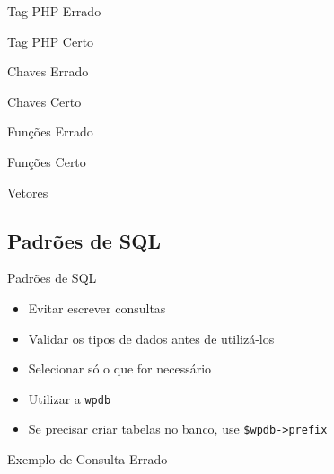 \documentclass{beamer}
\begin{document}
\begin{frame}{Tag PHP}
  \pause Errado
  
\end{frame}

\begin{frame}{Tag PHP}
  Certo
  
\end{frame}

\begin{frame}{Chaves}
  Errado
  
\end{frame}

\begin{frame}{Chaves}
  Certo
  
\end{frame}

\begin{frame}{Funções}
  Errado
  
\end{frame}

\begin{frame}{Funções}
  Certo
  
\end{frame}

\begin{frame}{Vetores}
  
\end{frame}

\subsection{Padrões de SQL}

\begin{frame}{Padrões de SQL}
\begin{itemize}
  \pause \item Evitar escrever consultas
  \pause \item Validar os tipos de dados antes de utilizá-los
  \pause \item Selecionar só o que for necessário
  \pause \item Utilizar a \texttt{wpdb}
  \pause \item Se precisar criar tabelas no banco, use \texttt{\$wpdb->prefix}
\end{itemize}
\end{frame}

\begin{frame}{Exemplo de Consulta}
  Errado
  
\end{frame}
\end{document}
